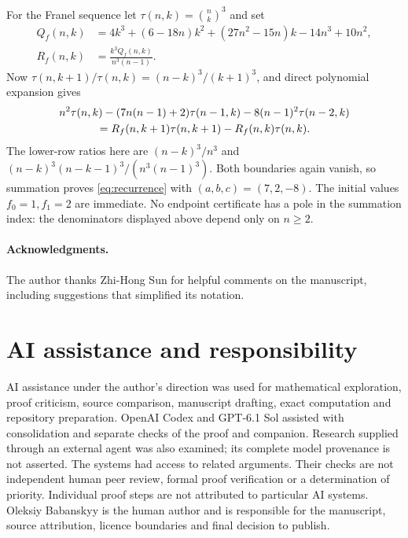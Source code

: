 \documentclass[11pt,a4paper]{article}
\theoremstyle{remark}\newtheorem{remark}[theorem]{Remark}
\begin{document}
For the Franel sequence let $\tau(n,k)=\binom nk^3$ and set
\begin{align*}
 Q_f(n,k)&=4k^3+(6-18n)k^2+(27n^2-15n)k-14n^3+10n^2,\\
 R_f(n,k)&=\frac{k^3Q_f(n,k)}{n^3(n-1)}.
\end{align*}
Now $\tau(n,k+1)/\tau(n,k)=(n-k)^3/(k+1)^3$, and direct polynomial
expansion gives
\begin{align}\label{eq:telescoping-f}
 &n^2\tau(n,k)-(7n(n-1)+2)\tau(n-1,k)
       -8(n-1)^2\tau(n-2,k)\notag\\
 &\hspace{12mm}=R_f(n,k+1)\tau(n,k+1)-R_f(n,k)\tau(n,k).
\end{align}
The lower-row ratios here are $(n-k)^3/n^3$ and
$(n-k)^3(n-k-1)^3/(n^3(n-1)^3)$.
Both boundaries again vanish, so summation proves
\eqref{eq:recurrence} with $(a,b,c)=(7,2,-8)$.
The initial values $f_0=1,f_1=2$ are immediate.
No endpoint certificate has a pole in the summation index: the
denominators displayed above depend only on $n\ge2$.

\paragraph{Acknowledgments.}
The author thanks Zhi-Hong Sun for helpful comments on the manuscript,
including suggestions that simplified its notation.

\section*{AI assistance and responsibility}
AI assistance under the author's direction was used for mathematical
exploration, proof criticism, source comparison, manuscript drafting,
exact computation and repository preparation. OpenAI Codex and GPT-6.1 Sol
assisted with consolidation and separate checks of the proof and companion.
Research supplied through an external agent was also examined; its complete
model provenance is not asserted. The systems had access to related
arguments. Their checks are not independent human peer review, formal
proof verification or a determination of priority. Individual proof steps
are not attributed to particular AI systems. Oleksiy Babanskyy is the human
author and is responsible for the manuscript, source attribution, licence
boundaries and final decision to publish.
\end{document}
